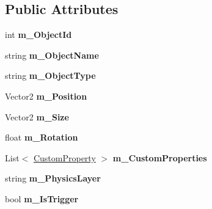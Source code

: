 \subsection*{Public Attributes}
\begin{DoxyCompactItemize}
\item 
\mbox{\label{class_super_tiled2_unity_1_1_collision_object_a839d474fe983c8e012a2b32645498eb9}} 
int {\bfseries m\+\_\+\+Object\+Id}
\item 
\mbox{\label{class_super_tiled2_unity_1_1_collision_object_a25244c845c5b59a3d8fc878c5227c855}} 
string {\bfseries m\+\_\+\+Object\+Name}
\item 
\mbox{\label{class_super_tiled2_unity_1_1_collision_object_a1f5d0f933d97fbf544800f3399fe9451}} 
string {\bfseries m\+\_\+\+Object\+Type}
\item 
\mbox{\label{class_super_tiled2_unity_1_1_collision_object_a98d7bb467bc1dd0a3285518742a9900e}} 
Vector2 {\bfseries m\+\_\+\+Position}
\item 
\mbox{\label{class_super_tiled2_unity_1_1_collision_object_a837b03484f813bd337e58c1637eaa521}} 
Vector2 {\bfseries m\+\_\+\+Size}
\item 
\mbox{\label{class_super_tiled2_unity_1_1_collision_object_a91d1097f03c26126988496f98f6b34d0}} 
float {\bfseries m\+\_\+\+Rotation}
\item 
\mbox{\label{class_super_tiled2_unity_1_1_collision_object_a590200ffdc17d4cab88f8e657aa6b7ea}} 
List$<$ \mbox{\hyperlink{class_super_tiled2_unity_1_1_custom_property}{Custom\+Property}} $>$ {\bfseries m\+\_\+\+Custom\+Properties}
\item 
\mbox{\label{class_super_tiled2_unity_1_1_collision_object_a89da58395fe6c1f7ae0b291942d1aa3a}} 
string {\bfseries m\+\_\+\+Physics\+Layer}
\item 
\mbox{\label{class_super_tiled2_unity_1_1_collision_object_a175df61dc35a141f3e885e78f933c3fd}} 
bool {\bfseries m\+\_\+\+Is\+Trigger}
\end{DoxyCompactItemize}
